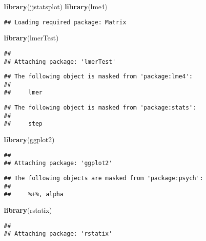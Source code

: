 \documentclass[
]{article}
\newenvironment{Shaded}{\begin{snugshade}}{\end{snugshade}}
\newcommand{\KeywordTok}[1]{\textcolor[rgb]{0.13,0.29,0.53}{\textbf{#1}}}
\newcommand{\NormalTok}[1]{#1}
\begin{document}
\begin{Shaded}
\begin{Highlighting}[]
\KeywordTok{library}\NormalTok{(jjstatsplot)}
\KeywordTok{library}\NormalTok{(lme4)}
\end{Highlighting}
\end{Shaded}

\begin{verbatim}
## Loading required package: Matrix
\end{verbatim}

\begin{Shaded}
\begin{Highlighting}[]
\KeywordTok{library}\NormalTok{(lmerTest)}
\end{Highlighting}
\end{Shaded}

\begin{verbatim}
## 
## Attaching package: 'lmerTest'
\end{verbatim}

\begin{verbatim}
## The following object is masked from 'package:lme4':
## 
##     lmer
\end{verbatim}

\begin{verbatim}
## The following object is masked from 'package:stats':
## 
##     step
\end{verbatim}

\begin{Shaded}
\begin{Highlighting}[]
\KeywordTok{library}\NormalTok{(ggplot2)}
\end{Highlighting}
\end{Shaded}

\begin{verbatim}
## 
## Attaching package: 'ggplot2'
\end{verbatim}

\begin{verbatim}
## The following objects are masked from 'package:psych':
## 
##     %+%, alpha
\end{verbatim}

\begin{Shaded}
\begin{Highlighting}[]
\KeywordTok{library}\NormalTok{(rstatix)}
\end{Highlighting}
\end{Shaded}

\begin{verbatim}
## 
## Attaching package: 'rstatix'
\end{verbatim}
\end{document}
